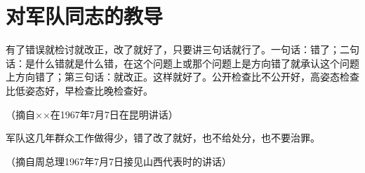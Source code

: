 \section[对军队同志的教导（一九六七年七月）]{对军队同志的教导}


有了错误就检讨就改正，改了就好了，只要讲三句话就行了。一句话：错了；二句话：是什么错就是什么错，在这个问题上或那个问题上是方向错了就承认这个问题上方向错了；第三句话：就改正。这样就好了。公开检查比不公开好，高姿态检查比低姿态好，早检查比晚检查好。

{\raggedleft （摘自××在1967年7月7日在昆明讲话）\par}

军队这几年群众工作做得少，错了改了就好，也不给处分，也不要治罪。

{\raggedleft （摘自周总理1967年7月7日接见山西代表时的讲话）\par}


